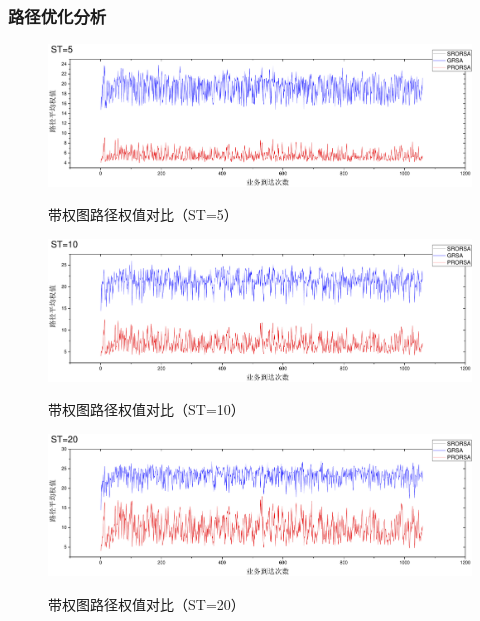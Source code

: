\subsubsection{路径优化分析}
\begin{figure}
\setlength{\belowcaptionskip}{-0.5cm}
\begin{center}
{\includegraphics[width=1 \textwidth]{figures/H5C.pdf}}
\end{center}
\caption{{\footnotesize{带权图路径权值对比（ST=5）}}}
\label{H5C}
\end{figure}
\begin{figure}
\setlength{\belowcaptionskip}{-0.5cm}
\begin{center}
{\includegraphics[width=1 \textwidth]{figures/H10C.pdf}}
\end{center}
\caption{{\footnotesize{带权图路径权值对比（ST=10）}}}
\label{H10C}
\end{figure}
\begin{figure}
\setlength{\belowcaptionskip}{-0.5cm}
\begin{center}
{\includegraphics[width=1 \textwidth]{figures/H20C.pdf}}
\end{center}
\caption{{\footnotesize{带权图路径权值对比（ST=20）}}}
\label{H20C}
\end{figure}
